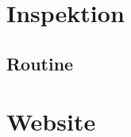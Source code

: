 \documentclass[a4paper,12pt,oneside]{book}
\begin{document}
	\frontmatter
	\pagestyle{fancy}
	\fancyhead{}
	\fancyfoot{}
	\printnomenclature
	
	\tableofcontents
	\mainmatter
	\chapter{Inspektion}
	
	\newpage
	\section{Routine}
	\chapter{Website}
	
	\backmatter
	\listoffigures
	\listoftables
	\printbibliography
\end{document}
